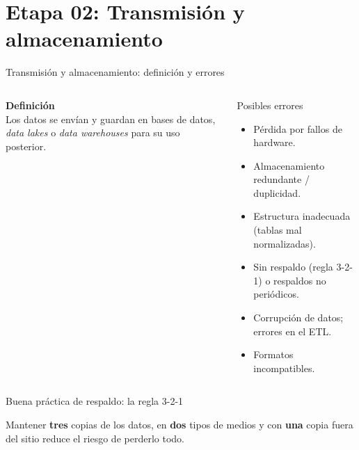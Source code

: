 \documentclass[aspectratio=169]{beamer}
\begin{document}
\section{Etapa 02: Transmisi\'on y almacenamiento}

\begin{frame}{Transmisi\'on y almacenamiento: definici\'on y errores}
  \begin{columns}[t]
      \textbf{Definici\'on}\\[2pt]
      Los datos se env\'ian y guardan en bases de datos, \emph{data lakes} o
      \emph{data warehouses} para su uso posterior.
      \begin{block}{Posibles errores}
        \begin{itemize}
          \item P\'erdida por fallos de hardware.
          \item Almacenamiento redundante / duplicidad.
          \item Estructura inadecuada (tablas mal normalizadas).
          \item Sin respaldo (regla 3-2-1) o respaldos no peri\'odicos.
          \item Corrupci\'on de datos; errores en el ETL.
          \item Formatos incompatibles.
        \end{itemize}
      \end{block}
  \end{columns}
\end{frame}

\begin{frame}[fragile]{Buena pr\'actica de respaldo: la regla 3-2-1}
  \begin{center}
  \end{center}
  \vspace{0.3em}
  Mantener \textbf{tres} copias de los datos, en \textbf{dos} tipos de medios y
  con \textbf{una} copia fuera del sitio reduce el riesgo de perderlo todo.
\end{frame}
\end{document}
